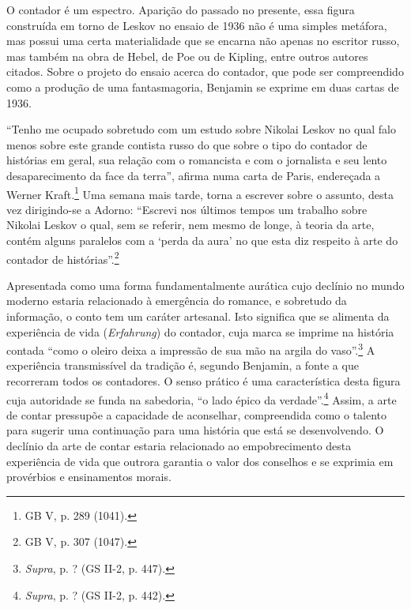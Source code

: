 O contador é um espectro. Aparição do passado no presente, essa figura
construída em torno de Leskov no ensaio de 1936 não é uma simples
metáfora, mas possui uma certa materialidade que se encarna não apenas
no escritor russo, mas também na obra de Hebel, de Poe ou de Kipling,
entre outros autores citados. Sobre o projeto do ensaio acerca do
contador, que pode ser compreendido como a produção de uma
fantasmagoria, Benjamin se exprime em duas cartas de 1936.

``Tenho me ocupado sobretudo com um estudo sobre Nikolai Leskov no qual
falo menos sobre este grande contista russo do que sobre o tipo do
contador de histórias em geral, sua relação com o romancista e com o
jornalista e seu lento desaparecimento da face da terra'', afirma numa
carta de Paris, endereçada a Werner Kraft.\footnote{GB V, p. 289 (1041).}
Uma semana mais tarde, torna a escrever sobre o assunto, desta vez
dirigindo-se a Adorno: ``Escrevi nos últimos tempos um trabalho sobre
Nikolai Leskov o qual, sem se referir, nem mesmo de longe, à teoria da
arte, contém alguns paralelos com a `perda da aura' no que esta diz
respeito à arte do contador de histórias''.\footnote{GB V, p. 307
  (1047).}

Apresentada como uma forma fundamentalmente aurática cujo declínio no
mundo moderno estaria relacionado à emergência do romance, e sobretudo
da informação, o conto tem um caráter artesanal. Isto significa que se
alimenta da experiência de vida (\emph{Erfahrung}) do contador, cuja
marca se imprime na história contada ``como o oleiro deixa a impressão
de sua mão na argila do vaso''.\footnote{\emph{Supra}, p. ? (GS II-2, p.
  447).} A experiência transmissível da tradição é, segundo Benjamin, a
fonte a que recorreram todos os contadores. O senso prático é uma
característica desta figura cuja autoridade se funda na sabedoria, ``o
lado épico da verdade''.\footnote{\emph{Supra}, p. ? (GS II-2, p. 442).}
Assim, a arte de contar pressupõe a capacidade de aconselhar,
compreendida como o talento para sugerir uma continuação para uma
história que está se desenvolvendo. O declínio da arte de contar estaria
relacionado ao empobrecimento desta experiência de vida que outrora
garantia o valor dos conselhos e se exprimia em provérbios e
ensinamentos morais.

